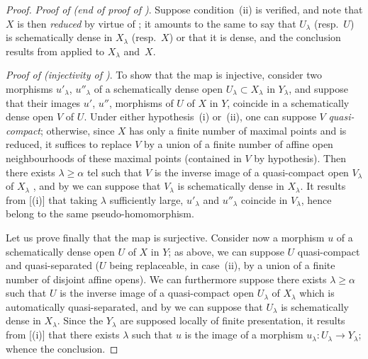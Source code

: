 \begin{proof}
\emph{Proof of  (end of proof of )}.
Suppose condition~(ii) is verified, and note that $X$ is then \emph{reduced} by virtue of ;
it amounts to the same to say that $U_\lambda$ (resp.\ $U$) is schematically dense in $X_\lambda$ (resp.\ $X$) or that it is dense, and the conclusion results from  applied to $X_\lambda$ and~$X$.

\emph{Proof of  (injectivity of )}.
To show that the map  is injective, consider two morphisms $u'_\lambda$, $u''_\lambda$ of a schematically dense open $U_\lambda\subset X_\lambda$ in $Y_\lambda$, and suppose that their images $u'$, $u''$, morphisms of $U$ of $X$ in $Y$, coincide in a schematically dense open $V$ of $U$.
Under either hypothesis~(i) or~(ii), one can suppose $V$ \emph{quasi-compact};
otherwise, since $X$ has only a finite number of maximal points and is reduced, it suffices to replace $V$ by a union of a finite number of affine open neighbourhoods of these maximal points (contained in $V$ by hypothesis).
Then there exists $\lambda\geq\alpha$ tel such that $V$ is the inverse image of a quasi-compact open $V_\lambda$ of $X_\lambda$ , and by  we can suppose that $V_\lambda$ is schematically dense in $X_\lambda$.
It results from [(i)] that taking $\lambda$ sufficiently large, $u'_\lambda$ and $u''_\lambda$ coincide in $V_\lambda$, hence belong to the same pseudo-homomorphism.

Let us prove finally that the map  is surjective.
Consider now a morphism $u$ of a schematically dense open $U$ of $X$ in $Y$;
as above, we can suppose $U$ quasi-compact and quasi-separated ($U$ being replaceable, in case~(ii), by a union of a finite number of disjoint affine opens).
We can furthermore suppose there exists $\lambda\geq\alpha$ such that $U$ is the inverse image of a quasi-compact open $U_\lambda$ of $X_\lambda$  which is automatically quasi-separated, and by  we can suppose that $U_\lambda$ is schematically dense in $X_\lambda$.
Since the $Y_\lambda$ are supposed locally of finite presentation, it results from [(i)] that there exists $\lambda$ such that $u$ is the image of a morphism $u_\lambda:U_\lambda\to Y_\lambda$; whence the conclusion.


\end{proof}
